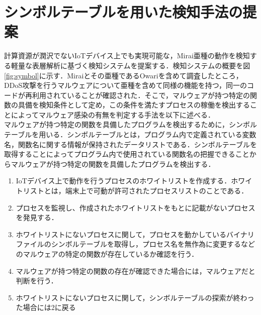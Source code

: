 \section{シンボルテーブルを用いた検知手法の提案}
計算資源が潤沢でないIoTデバイス上でも実現可能な，Mirai亜種の動作を検知する軽量な表層解析に基づく検知システムを提案する．検知システムの概要を図\ref{fig:symbol}に示す．Miraiとその亜種であるOwariを含めて調査したところ，DDoS攻撃を行うマルウェアについて亜種を含めて同様の機能を持つ，同一のコードが再利用されていることが確認された．そこで，マルウェアが持つ特定の関数の具備を検知条件として定め，この条件を満たすプロセスの稼働を検出することによってマルウェア感染の有無を判定する手法を以下に述べる．\\
マルウェアが持つ特定の関数を具備したプログラムを検出するために，シンボルテーブルを用いる．シンボルテーブルとは，プログラム内で定義されている変数名，関数名に関する情報が保持されたデータリストである．シンボルテーブルを取得することによってプログラム内で使用されている関数名の把握できることからマルウェアが持つ特定の関数を具備したプログラムを検出する．

\begin{enumerate}
 \item IoTデバイス上で動作を行うプロセスのホワイトリストを作成する．ホワイトリストとは，端末上で可動が許可されたプロセスリストのことである．
 \item プロセスを監視し、作成されたホワイトリストをもとに記載がないプロセスを発見する．
 \item ホワイトリストにないプロセスに関して，プロセスを動かしているバイナリファイルのシンボルテーブルを取得し，プロセス名を無作為に変更するなどのマルウェアの特定の関数が存在しているか確認を行う．
\item マルウェアが持つ特定の関数の存在が確認できた場合には，マルウェアだと判断を行う．
 \item ホワイトリストにないプロセスに関して，シンボルテーブルの探索が終わった場合には2に戻る
\end{enumerate}

